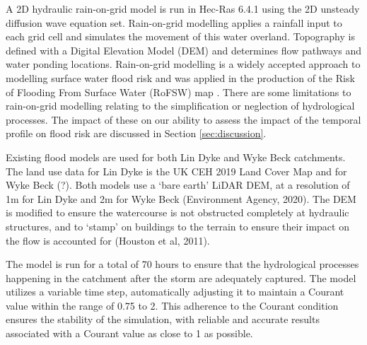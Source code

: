 \documentclass[APA,Times2COL]{WileyNJDv5}
\begin{document}
A 2D hydraulic rain-on-grid model is run in Hec-Ras 6.4.1 using the 2D unsteady diffusion wave equation set. Rain-on-grid modelling applies a rainfall input to each grid cell and simulates the movement of this water overland. Topography is defined with a Digital Elevation Model (DEM) and determines flow pathways and water ponding locations. Rain-on-grid modelling is a widely accepted approach to modelling surface water flood risk and was applied in the production of the Risk of Flooding From Surface Water (RoFSW) map \citep{environment2019risk}. There are some limitations to rain-on-grid modelling relating to the simplification or neglection of hydrological processes. The impact of these on our ability to assess the impact of the temporal profile on flood risk are discussed in Section \ref{sec:discussion}.

Existing flood models are used for both Lin Dyke \citep{beadle2021} and Wyke Beck \citep{singh2023drainage} catchments. The land use data for Lin Dyke is the UK CEH 2019 Land Cover Map \citep{morton2020land} and for Wyke Beck (?). Both models use a `bare earth' LiDAR DEM, at a resolution of 1m for Lin Dyke and 2m for Wyke Beck (Environment Agency, 2020). The DEM is modified to ensure the watercourse is not obstructed completely at hydraulic structures, and to `stamp' on buildings to the terrain to ensure their impact on the flow is accounted for (Houston et al, 2011). 

The model is run for a total of 70 hours to ensure that the hydrological processes happening in the catchment after the storm are adequately captured. 
The model utilizes a variable time step, automatically adjusting it to maintain a Courant value within the range of 0.75 to 2. This adherence to the Courant condition ensures the stability of the simulation, with reliable and accurate results associated with a Courant value as close to 1 as possible.

\end{document}

